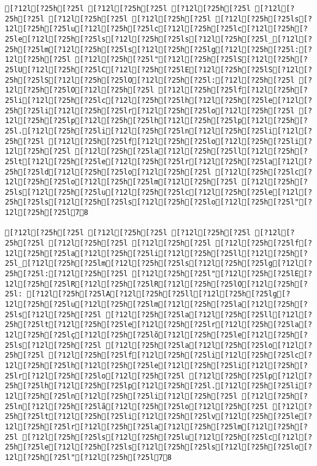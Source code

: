 \documentclass{scrartcl}
\begin{document}
\begin{Verbatim}
[?12l[?25h[?25l [?12l[?25h[?25l [?12l[?25h[?25l [?12l[?25h[?25l [?12l[?25h[?25l [?12l[?25h[?25l [?12l[?25h[?25ls[?12l[?25h[?25lu[?12l[?25h[?25lc[?12l[?25h[?25lc[?12l[?25h[?25le[?12l[?25h[?25ls[?12l[?25h[?25ls[?12l[?25h[?25l_[?12l[?25h[?25lm[?12l[?25h[?25ls[?12l[?25h[?25lg[?12l[?25h[?25l:[?12l[?25h[?25l [?12l[?25h[?25l"[?12l[?25h[?25lS[?12l[?25h[?25lU[?12l[?25h[?25lC[?12l[?25h[?25lE[?12l[?25h[?25lS[?12l[?25h[?25lS[?12l[?25h[?25lO[?12l[?25h[?25l:[?12l[?25h[?25l [?12l[?25h[?25lO[?12l[?25h[?25l [?12l[?25h[?25lf[?12l[?25h[?25li[?12l[?25h[?25lc[?12l[?25h[?25lh[?12l[?25h[?25le[?12l[?25h[?25li[?12l[?25h[?25lr[?12l[?25h[?25lo[?12l[?25h[?25l [?12l[?25h[?25lp[?12l[?25h[?25lh[?12l[?25h[?25lp[?12l[?25h[?25l.[?12l[?25h[?25li[?12l[?25h[?25ln[?12l[?25h[?25li[?12l[?25h[?25l [?12l[?25h[?25lf[?12l[?25h[?25lo[?12l[?25h[?25li[?12l[?25h[?25l [?12l[?25h[?25la[?12l[?25h[?25ll[?12l[?25h[?25lt[?12l[?25h[?25le[?12l[?25h[?25lr[?12l[?25h[?25la[?12l[?25h[?25ld[?12l[?25h[?25lo[?12l[?25h[?25l [?12l[?25h[?25lc[?12l[?25h[?25lo[?12l[?25h[?25lm[?12l[?25h[?25l [?12l[?25h[?25ls[?12l[?25h[?25lu[?12l[?25h[?25lc[?12l[?25h[?25le[?12l[?25h[?25ls[?12l[?25h[?25ls[?12l[?25h[?25lo[?12l[?25h[?25l"[?12l[?25h[?25l78

[?12l[?25h[?25l [?12l[?25h[?25l [?12l[?25h[?25l [?12l[?25h[?25l [?12l[?25h[?25l [?12l[?25h[?25l [?12l[?25h[?25lf[?12l[?25h[?25la[?12l[?25h[?25li[?12l[?25h[?25ll[?12l[?25h[?25l_[?12l[?25h[?25lm[?12l[?25h[?25ls[?12l[?25h[?25lg[?12l[?25h[?25l:[?12l[?25h[?25l [?12l[?25h[?25l"[?12l[?25h[?25lE[?12l[?25h[?25lR[?12l[?25h[?25lR[?12l[?25h[?25lO[?12l[?25h[?25l: [?12l[?25h[?25lA[?12l[?25h[?25ll[?12l[?25h[?25lg[?12l[?25h[?25lu[?12l[?25h[?25lm[?12l[?25h[?25la[?12l[?25h[?25ls[?12l[?25h[?25l [?12l[?25h[?25la[?12l[?25h[?25ll[?12l[?25h[?25lt[?12l[?25h[?25le[?12l[?25h[?25lr[?12l[?25h[?25la[?12l[?25h[?25lç[?12l[?25h[?25lõ[?12l[?25h[?25le[?12l[?25h[?25ls[?12l[?25h[?25l [?12l[?25h[?25la[?12l[?25h[?25lo[?12l[?25h[?25l [?12l[?25h[?25lf[?12l[?25h[?25li[?12l[?25h[?25lc[?12l[?25h[?25lh[?12l[?25h[?25le[?12l[?25h[?25li[?12l[?25h[?25lr[?12l[?25h[?25lo[?12l[?25h[?25l [?12l[?25h[?25lp[?12l[?25h[?25lh[?12l[?25h[?25lp[?12l[?25h[?25l.[?12l[?25h[?25li[?12l[?25h[?25ln[?12l[?25h[?25li[?12l[?25h[?25l [?12l[?25h[?25ln[?12l[?25h[?25lã[?12l[?25h[?25lo[?12l[?25h[?25l [?12l[?25h[?25lt[?12l[?25h[?25li[?12l[?25h[?25lv[?12l[?25h[?25le[?12l[?25h[?25lr[?12l[?25h[?25la[?12l[?25h[?25lm[?12l[?25h[?25l [?12l[?25h[?25ls[?12l[?25h[?25lu[?12l[?25h[?25lc[?12l[?25h[?25le[?12l[?25h[?25ls[?12l[?25h[?25ls[?12l[?25h[?25lo[?12l[?25h[?25l"[?12l[?25h[?25l78


\end{Verbatim}
\end{document}
